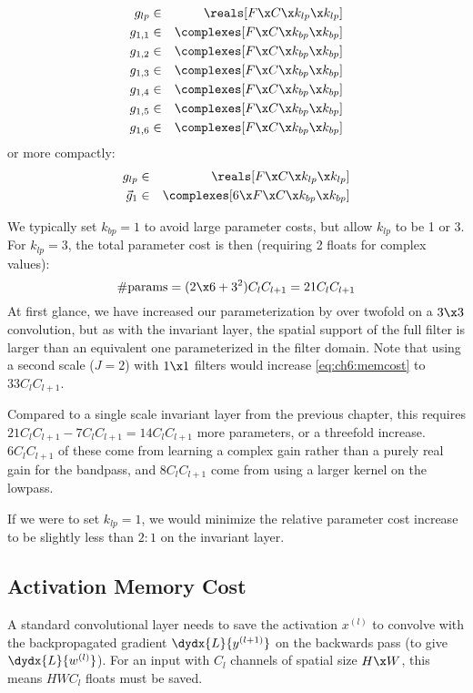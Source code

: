 \begin{eqnarray*}
  g_{lp} &\in& \reals[F\x C\x k_{lp}\x k_{lp}] \\
  g_{1,1} &\in& \complexes[F\x C\x k_{bp}\x k_{bp}] \\
  g_{1,2} &\in& \complexes[F\x C\x k_{bp}\x k_{bp}] \\
  g_{1,3} &\in& \complexes[F\x C\x k_{bp}\x k_{bp}] \\
  g_{1,4} &\in& \complexes[F\x C\x k_{bp}\x k_{bp}] \\
  g_{1,5} &\in& \complexes[F\x C\x k_{bp}\x k_{bp}] \\
  g_{1,6} &\in& \complexes[F\x C\x k_{bp}\x k_{bp}] 
\end{eqnarray*}
%
or more compactly:
%
\begin{eqnarray*}
  g_{lp} &\in& \reals[F\x C\x k_{lp}\x k_{lp}] \\
  \vec{g}_{1} &\in& \complexes[6\x F\x C\x k_{bp}\x k_{bp}] 
\end{eqnarray*}

We typically set $k_{bp} = 1$ to avoid large parameter costs, but allow $k_{lp}$
to be 1 or 3. For $k_{lp} = 3$, the total parameter cost is then (requiring 2
floats for complex values):
%
\begin{equation}
  \text{\#params} = (2\x 6 + 3^2)C_lC_{l+1} = 21C_lC_{l+1} \label{eq:ch6:memcost}
\end{equation} 
%
At first glance, we have increased our parameterization by over twofold on a $3\x 3$ 
convolution, but as with the invariant layer, the spatial support of the full
filter is larger than an equivalent one parameterized in the filter domain. Note
that using a second scale ($J=2$) with $1\x 1$ filters would increase
\eqref{eq:ch6:memcost} to $33C_lC_{l+1}$. 

Compared to a single scale invariant layer from the previous chapter, this requires
$21C_lC_{l+1} - 7C_lC_{l+1} = 14C_lC_{l+1}$ more parameters, or a threefold
increase. $6C_lC_{l+1}$ of these come from learning a complex gain rather than a
purely real gain for the bandpass, and $8C_lC_{l+1}$ come from using a larger
kernel on the lowpass. 

If we were to set $k_{lp} = 1$, we would minimize the 
relative parameter cost increase to be slightly
less than $2:1$ on the invariant layer.

\subsection{Activation Memory Cost}\label{sec:ch6:act_memory}
A standard convolutional layer needs to save the activation $x^{(l)}$ to
convolve with the backpropagated gradient $\dydx{L}{y^{(l+1)}}$ on the backwards
pass (to give $\dydx{L}{w^{(l)}}$). For an input with $C_l$ channels of spatial
size $H\x W$, this means $HWC_l$ floats must be saved. 

